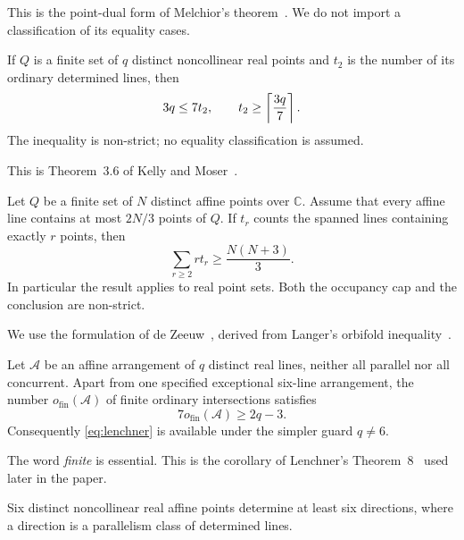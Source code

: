 This is the point-dual form of Melchior's theorem~\cite{Melchior1940}.  We do
not import a classification of its equality cases.

\begin{theorem}\label{thm:kelly-moser}
If $Q$ is a finite set of $q$ distinct noncollinear real points and $t_2$ is
the number of its ordinary determined lines, then
\begin{equation}\label{eq:kelly-moser}
 3q\leq7t_2,
 \qquad
 t_2\geq\left\lceil \frac{3q}{7}\right\rceil.
\end{equation}
The inequality is non-strict; no equality classification is assumed.
\end{theorem}

This is Theorem~3.6 of Kelly and Moser~\cite{KellyMoser1958}.

\begin{theorem}\label{thm:langer}
Let $Q$ be a finite set of $N$ distinct affine points over $\mathbb C$.
Assume that every affine line contains at most $2N/3$ points of $Q$.  If
$t_r$ counts the spanned lines containing exactly $r$ points, then
\begin{equation}\label{eq:langer}
 \sum_{r\geq2}r t_r\geq\frac{N(N+3)}{3}.
\end{equation}
In particular the result applies to real point sets.  Both the occupancy cap
and the conclusion are non-strict.
\end{theorem}

We use the formulation of de Zeeuw~\cite{DeZeeuw2018}, derived from
Langer's orbifold inequality~\cite{Langer2003}.

\begin{theorem}[Lenchner]\label{thm:lenchner}
Let $\mathcal A$ be an affine arrangement of $q$ distinct real lines, neither
all parallel nor all concurrent.  Apart from one specified exceptional
six-line arrangement, the number $o_{\mathrm{fin}}(\mathcal A)$ of finite
ordinary intersections satisfies
\begin{equation}\label{eq:lenchner}
 7o_{\mathrm{fin}}(\mathcal A)\geq2q-3.
\end{equation}
Consequently \eqref{eq:lenchner} is available under the simpler guard
$q\neq6$.
\end{theorem}

The word \emph{finite} is essential.  This is the corollary of Lenchner's
Theorem~8~\cite{Lenchner2007} used later in the paper.

\begin{theorem}\label{thm:ungar-six}
Six distinct noncollinear real affine points determine at least six
directions, where a direction is a parallelism class of determined lines.
\end{theorem}

